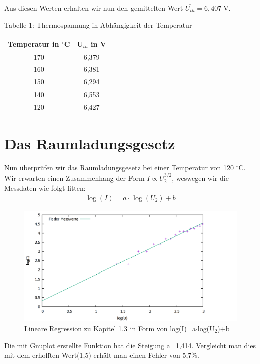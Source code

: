 Aus diesen Werten erhalten wir nun den gemittelten Wert $ \overline{U_{th}} =6,407\; $V.
\begin{center}
	Tabelle 1: Thermospannung in Abhängigkeit der Temperatur
\end{center}
\begin{center}
	\begin{tabular}{|c|c|}
		\hline
		Temperatur in $^\circ$C & U$_{th}$ in V \\ \hline
		170           &     6,379     \\ \hline
		160           &     6,381     \\ \hline
		150           &     6,294     \\ \hline
		140           &     6,553     \\ \hline
		120           &     6,427     \\ \hline
	\end{tabular} 
\end{center}
\newpage
\section{Das Raumladungsgesetz}
Nun überprüfen wir das Raumladungsgesetz bei einer Temperatur von 120 $ ^\circ $C. Wir erwarten einen Zusammenhang der Form $I\propto U_{2}^{3/2}  $, weswegen wir die Messdaten wie folgt fitten:
\begin{align*}
\log(I)=a\cdot \log(U_{2})+b
\end{align*}
\begin{figure}
	\includegraphics[width=\textwidth]{../Daten/Aufgabe1/Aufgabe1_3.png}
	\caption{Lineare Regression zu Kapitel 1.3 in Form von log(I)=a$ \cdot $log(U$ _2 $)+b}
\end{figure}
Die mit Gnuplot erstellte Funktion hat die Steigung a=1,414. Vergleicht man dies mit dem erhofften Wert(1,5) erhält man einen Fehler von 5,7\%.

